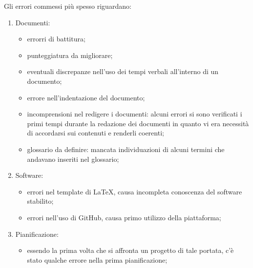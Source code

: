 \documentclass[../piano_di_qualifica.tex]{subfiles}
\begin{document}
Gli errori commessi più spesso riguardano:
\begin{enumerate}
    \item Documenti:
    \begin{itemize}
        \item errorri di battitura; 
        \item punteggiatura da migliorare;
        \item eventuali discrepanze nell'uso dei tempi verbali all'interno di un documento;
        \item errore nell'indentazione del documento;
        \item incomprensioni nel redigere i documenti: alcuni errori si sono verificati i primi tempi durante la redazione dei documenti in quanto 
                vi era necessità di accordarsi sui contenuti e renderli coerenti;
        \item glossario da definire: mancata individuazioni di alcuni termini che andavano inseriti nel glossario;
    \end{itemize}
    \item Software:
    \begin{itemize}
        \item errori nel template di \LaTeX, causa incompleta conoscenza del software stabilito;
        \item errori nell'uso di GitHub, causa primo utilizzo della piattaforma;
    \end{itemize}
    \item Pianificazione:
    \begin{itemize}
        \item essendo la prima volta che si affronta un progetto di tale portata, c'è stato qualche errore nella prima pianificazione;
    \end{itemize}
\end{enumerate}
\end{document}
